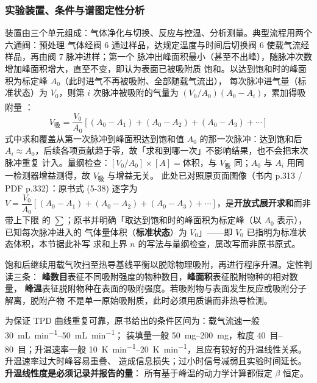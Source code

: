 \subsubsection{实验装置、条件与谱图定性分析}

装置由三个单元组成：气体净化与切换、反应与控温、分析测量。典型流程用两个六通阀：预处理
气体经阀 6 通过样品，达规定温度与时间后切换阀 6 使载气流经样品，再由阀 7 脉冲进样；第一个
脉冲出峰面积最小（甚至不出峰），随脉冲次数增加峰面积增大，直至不变，即认为表面已被吸附质
饱和。以达到饱和时的峰面积为标定峰 $A_0$（此时进气不再被吸附、全部随载气流出），
每次脉冲进气量（标准状态）为 $V_0$，则第 $i$ 次脉冲被吸附的气量为
$(V_0/A_0)(A_0-A_i)$，累加得吸附量
\textsuperscript{}：
\begin{equation}
V_{\text{吸}} = \frac{V_0}{A_0}\left[\left(A_0 - A_1\right)+\left(A_0 - A_2\right)+\left(A_0 - A_3\right)+\cdots\right]
\label{eq:ch05-pulse}
\end{equation}
式中求和覆盖从第一次脉冲到峰面积达到饱和值 $A_0$ 的那一次脉冲：达到饱和后
$A_i\approx A_0$，后续各项贡献趋于零，故「求和到哪一次」不影响结果，也不会把末次脉冲重复
计入。量纲检查：$[V_0/A_0]\times[A]=\text{体积}$，与 $V_{\text{吸}}$ 同；$A_0$ 与
$A_i$ 用同一检测器增益测得，故 $V_{\text{吸}}$ 与增益无关。
此处已对照原页面图像（书内 p.313 / PDF p.332）：原书式 (5-38) 逐字为
$V=\dfrac{V_0}{A_0}[(A_0-A_1)+(A_0-A_2)+(A_0-A_3)+\cdots]$，是\textbf{开放式展开求和}而非带上下限
的 $\sum$；原书并明确「取达到饱和时的峰面积为标定峰（以 $A_0$ 表示），已知每次脉冲进入的
气体量体积（\textbf{标准状态}）为 $V_0$」——即 $V_0$ 已指明为标准状态体积，本节据此补写
求和上界 $n$ 的写法与量纲检查，属改写而非原书原式。

饱和后继续用载气吹扫至热导基线平衡以脱除物理吸附，再进行程序升温。定性判读三条：
\textbf{峰数目}表征不同吸附强度的物种数目，\textbf{峰面积}表征脱附物种的相对数量，
\textbf{峰温}表征脱附物种在表面的吸附强度。若吸附物与表面发生反应或吸附分子解离，脱附产物
不是单一原始吸附质，此时必须用质谱而非热导检测。

\begin{measure}
为保证 TPD 曲线重复可靠，原书给出的条件区间为：载气流速一般 \qtyrange{30}{50}{mL.min^{-1}}；
装填量一般 \qtyrange{50}{200}{mg}，粒度 \qtyrange{40}{80}{目}；升温速率一般
\qtyrange{10}{20}{K.min^{-1}}，且应有较好的升温线性关系。升温速率过大时峰容易重叠、
造成信息损失；过小时信号减弱且实验时间延长。\textbf{升温线性度是必须记录并报告的量}：
所有基于峰温的动力学计算都假定 $\beta$ 恒定。
\end{measure}

